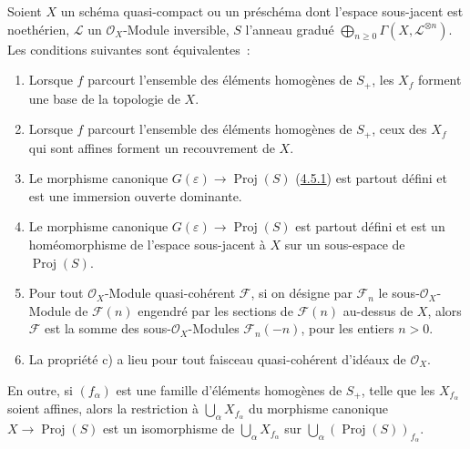 \begin{theorem}[4.5.2]
\label{II.4.5.2-fr}
Soient $X$ un schéma quasi-compact ou un préschéma dont l'espace sous-jacent
est noethérien, $\mathcal{L}$ un $\mathcal{O}_X$-Module inversible, $S$
l'anneau gradué
$\bigoplus_{n\geq0}\Gamma(X,\mathcal{L}^{\otimes n})$. Les conditions
suivantes sont équivalentes~:
\begin{enumerate}
  \item[\rm{a)}] Lorsque $f$ parcourt l'ensemble des éléments homogènes de
  $S_+$, les $X_f$ forment une base de la topologie de $X$.
  \item[\rm{a')}] Lorsque $f$ parcourt l'ensemble des éléments homogènes de
  $S_+$, ceux des $X_f$ qui sont affines forment un recouvrement de $X$.
  \item[\rm{b)}] Le morphisme canonique
  $G(\varepsilon)\to\operatorname{Proj}(S)$
  (\hyperref[II.4.5.1-fr]{4.5.1}) est partout défini et est une immersion
  ouverte dominante.


  \item[\rm{b')}] Le morphisme canonique
  $G(\varepsilon)\to\operatorname{Proj}(S)$ est partout défini et est un
  homéomorphisme de l'espace sous-jacent à $X$ sur un sous-espace de
  $\operatorname{Proj}(S)$.
  \item[\rm{c)}] Pour tout $\mathcal{O}_X$-Module quasi-cohérent
  $\mathcal{F}$, si on désigne par $\mathcal{F}_n$ le
  sous-$\mathcal{O}_X$-Module de $\mathcal{F}(n)$ engendré par les sections de
  $\mathcal{F}(n)$ au-dessus de $X$, alors $\mathcal{F}$ est la somme des
  sous-$\mathcal{O}_X$-Modules $\mathcal{F}_n(-n)$, pour les entiers $n>0$.
  \item[\rm{c')}] La propriété c) a lieu pour tout faisceau quasi-cohérent
  d'idéaux de $\mathcal{O}_X$.
\end{enumerate}
En outre, si $(f_\alpha)$ est une famille d'éléments homogènes de $S_+$,
telle que les $X_{f_\alpha}$ soient affines, alors la restriction à
$\bigcup_\alpha X_{f_\alpha}$ du morphisme canonique
$X\to\operatorname{Proj}(S)$ est un isomorphisme de
$\bigcup_\alpha X_{f_\alpha}$ sur
$\bigcup_\alpha(\operatorname{Proj}(S))_{f_\alpha}$.
\end{theorem}


